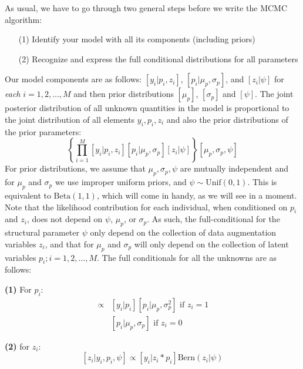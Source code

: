 As usual, we have to go through two general steps before we write the MCMC algorithm:
\begin{itemize}
\item[  (1)] Identify your model with all its components (including
    priors)
\item[  (2)] Recognize and express the full conditional distributions for
    all parameters
\end{itemize}
Our model components are as follows: $[y_{i}| p_{i},z_{i}]$,
$[p_{i}|\mu_{p},\sigma_{p}]$, and $[z_{i}|\psi]$
for {\it each} $i=1,2,\ldots,M$ and then prior distributions
$[\mu_{p}]$, $[\sigma_{p}]$ and $[\psi]$.
The joint posterior distribution of all unknown quantities in the model
is proportional to the joint distribution of all elements
$y_{i},p_{i},z_{i}$ and also the prior distributions of the prior parameters:
\[
\left\{ \prod_{i=1}^{M} [y_{i}|p_{i},z_{i}][p_{i}|\mu_{p},\sigma_{p}]
[z_{i}|\psi] \right\} [\mu_{p},\sigma_{p},\psi]
\]
For prior distributions, we assume that $\mu_{p},\sigma_{p}, \psi$ are
mutually independent and for $\mu_{p}$ and $\sigma_{p}$ we use
improper uniform priors, and $\psi \sim \mbox{Unif}(0,1)$.  This is
equivalent to $\mbox{Beta}(1,1)$, which will come in handy, as we will
see in a moment. Note that the likelihood contribution for each
individual, when conditioned on $p_{i}$ and $z_{i}$, does not depend
on $\psi$, $\mu_{p}$, or $\sigma_{p}$.  As such, the full-conditional
for the structural parameter $\psi$ only depend on the collection of
data augmentation variables $z_{i}$, and that for $\mu_{p}$ and
$\sigma_{p}$ will only depend on the collection of latent variables
$p_{i}; i=1,2,\ldots,M$.  The full conditionals for all the unknowns
are as follows:

{\bf (1)} For $p_{i}$:
\begin{eqnarray*}
[p_{i}|y_{i}, \mu_p, \sigma_{p},z_{i}] &\propto  &
[y_{i}|p_{i}][p_{i}|\mu_p,\sigma_{p}^{2}] \mbox{ if $z_{i}=1$ }  \\
                 &  &  [p_{i}|\mu_p,\sigma_{p}] \mbox{ if $z_{i}=0$ }
\end{eqnarray*}

{\bf (2)} for $z_{i}$:
\[
[z_{i} | y_{i}, p_{i}, \psi] \propto [y_{i}|z_{i}*p_{i}] \mbox{Bern}(z_{i}|\psi)
\]

